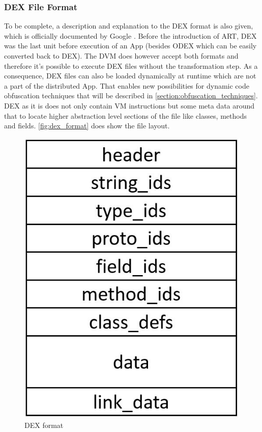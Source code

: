 \subsubsection{DEX File Format}
\label{section:dex_file_format}
To be complete, a description and explanation to the DEX format is also given,
which is officially documented by Google \parencite{dex}.
Before the introduction of ART, DEX was the last unit before
execution of an App (besides ODEX which can be easily converted back to DEX). The DVM does however accept
both formats and therefore it's possible to execute
DEX files without the transformation step. As a consequence,
DEX files can also be loaded dynamically at runtime which are not a part
of the distributed App. That enables new possibilities for dynamic code obfuscation techniques that will be described in \autoref{section:obfuscation_techniques}. DEX as it is does not only contain
VM instructions but some meta data around that to locate
higher abstraction level sections of the file like classes,
methods and fields.
\autoref{fig:dex_format} does show the file layout.
\begin{figure}[htb]
  \centering
  \includegraphics[scale=0.3]{figures/dex_format}
  \caption[DEX format]{DEX format}
  \label{fig:dex_format}
\end{figure}
